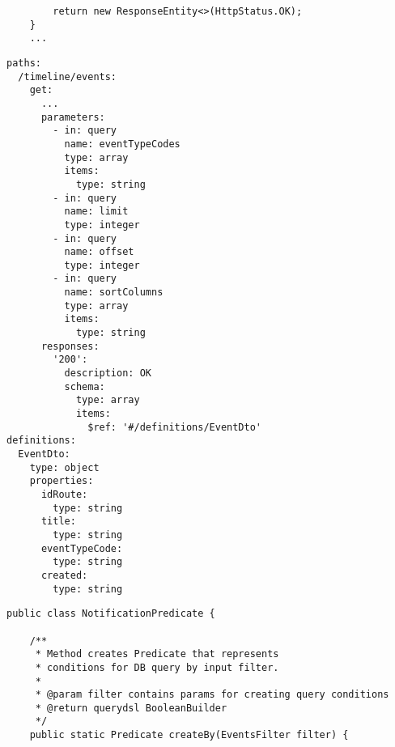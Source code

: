 \documentclass[twoside, 12pt]{article}
\begin{document}
{{\begin{lstlisting}
        return new ResponseEntity<>(HttpStatus.OK);
    }
    ...

\end{lstlisting}

\clearpage


\vspace{10}



\vspace{10}


\vspace{10}




\begin{lstlisting}
paths:
  /timeline/events:
    get:
      ...
      parameters:
        - in: query
          name: eventTypeCodes
          type: array
          items:
            type: string
        - in: query
          name: limit
          type: integer
        - in: query
          name: offset
          type: integer
        - in: query
          name: sortColumns
          type: array
          items:
            type: string
      responses:
        '200':
          description: OK
          schema:
            type: array
            items:
              $ref: '#/definitions/EventDto'
definitions:
  EventDto:
    type: object
    properties:
      idRoute:
        type: string
      title:
        type: string
      eventTypeCode:
        type: string
      created:
        type: string
\end{lstlisting}

\clearpage


\begin{lstlisting}
public class NotificationPredicate {

    /**
     * Method creates Predicate that represents
     * conditions for DB query by input filter.
     *
     * @param filter contains params for creating query conditions
     * @return querydsl BooleanBuilder
     */
    public static Predicate createBy(EventsFilter filter) {


\end{lstlisting}}}
\end{document}
